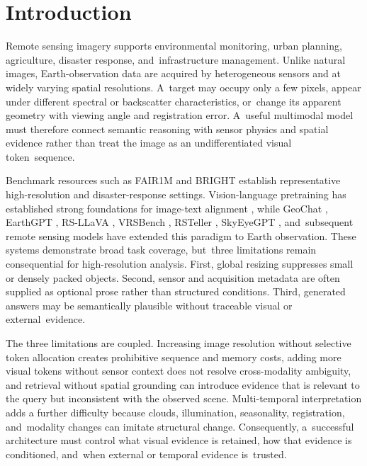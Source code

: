 \documentclass[applsci,article,accept,moreauthors]{Definitions/mdpi}
\begin{document}
\section{Introduction}

Remote sensing imagery supports environmental monitoring, urban planning, agriculture, disaster response, and~infrastructure management. Unlike natural images, Earth-observation data are acquired by heterogeneous sensors and at widely varying spatial resolutions. A~target may occupy only a few pixels, appear under different spectral or backscatter characteristics, or~change its apparent geometry with viewing angle and registration error. A~useful multimodal model must therefore connect semantic reasoning with sensor physics and spatial evidence rather than treat the image as an undifferentiated visual token~sequence.

Benchmark resources such as FAIR1M \citep{ref1} and BRIGHT \citep{ref2} establish representative high-resolution and disaster-response settings. Vision-language pretraining has established strong foundations for image-text alignment \citep{ref3,ref4,ref5,ref6,ref7}, while GeoChat \citep{ref8}, EarthGPT \citep{ref9}, RS-LLaVA \citep{ref10}, VRSBench \citep{ref11}, \linebreak RSTeller \citep{ref12}, SkyEyeGPT \citep{ref13}, and~subsequent remote sensing models \citep{ref14,ref15,ref16,ref17,ref18,ref19,ref20,ref21,ref22} have extended this paradigm to Earth observation. These systems demonstrate broad task coverage, but~three limitations remain consequential for high-resolution analysis. First, global resizing suppresses small or densely packed objects. Second, sensor and acquisition metadata are often supplied as optional prose rather than structured conditions. Third, generated answers may be semantically plausible without traceable visual or external~evidence.

The three limitations are coupled. Increasing image resolution without selective token allocation creates prohibitive sequence and memory costs, adding more visual tokens without sensor context does not resolve cross-modality ambiguity, and retrieval without spatial grounding can introduce evidence that is relevant to the query but inconsistent with the observed scene. Multi-temporal interpretation adds a further difficulty because clouds, illumination, seasonality, registration, and~modality changes can imitate structural change. Consequently, a~successful architecture must control what visual evidence is retained, how that evidence is conditioned, and~when external or temporal evidence is~trusted.
\end{document}
